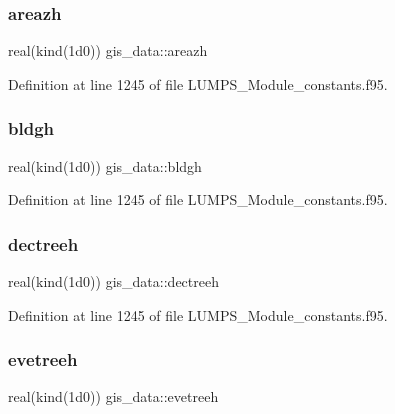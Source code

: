 \mbox{\label{namespacegis__data_a59a6c27dbdfd939e15369ac064221241}} 
\subsubsection{\texorpdfstring{areazh}{areazh}}
{\footnotesize\ttfamily real(kind(1d0)) gis\+\_\+data\+::areazh}



Definition at line 1245 of file L\+U\+M\+P\+S\+\_\+\+Module\+\_\+constants.\+f95.

\mbox{\label{namespacegis__data_a2a0cc85bf87fdf807e528acb5c7b0740}} 
\subsubsection{\texorpdfstring{bldgh}{bldgh}}
{\footnotesize\ttfamily real(kind(1d0)) gis\+\_\+data\+::bldgh}



Definition at line 1245 of file L\+U\+M\+P\+S\+\_\+\+Module\+\_\+constants.\+f95.

\mbox{\label{namespacegis__data_a4f60c63599a3076e7b8ffabbcaa57405}} 
\subsubsection{\texorpdfstring{dectreeh}{dectreeh}}
{\footnotesize\ttfamily real(kind(1d0)) gis\+\_\+data\+::dectreeh}



Definition at line 1245 of file L\+U\+M\+P\+S\+\_\+\+Module\+\_\+constants.\+f95.

\mbox{\label{namespacegis__data_a2eab7550922ec226bac9160b71203e83}} 
\subsubsection{\texorpdfstring{evetreeh}{evetreeh}}
{\footnotesize\ttfamily real(kind(1d0)) gis\+\_\+data\+::evetreeh}



